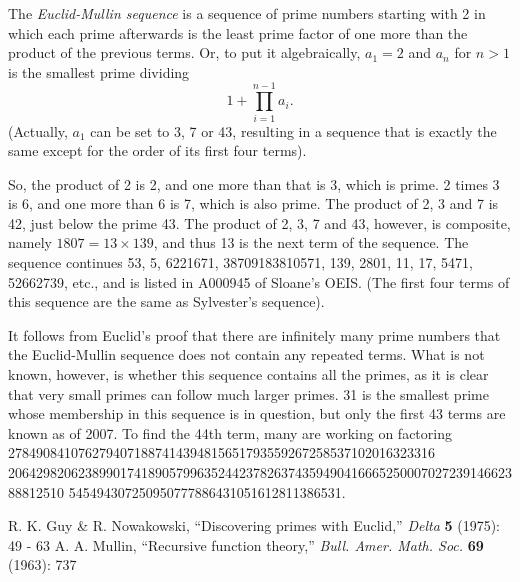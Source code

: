 \documentclass[12pt]{article}
\begin{document}
The {\em Euclid-Mullin sequence} is a sequence of prime numbers starting with 2 in which each prime afterwards is the least prime factor of one more than the product of the previous terms. Or, to put it algebraically, $a_1 = 2$ and $a_n$ for $n > 1$ is the smallest prime dividing $$1 + \prod_{i = 1}^{n - 1} a_i.$$ (Actually, $a_1$ can be set to 3, 7 or 43, resulting in a sequence that is exactly the same except for the order of its first four terms).

So, the product of 2 is 2, and one more than that is 3, which is prime. 2 times 3 is 6, and one more than 6 is 7, which is also prime. The product of 2, 3 and 7 is 42, just below the prime 43. The product of 2, 3, 7 and 43, however, is composite, namely $1807 = 13 \times 139$, and thus 13 is the next term of the sequence. The sequence continues 53, 5, 6221671, 38709183810571, 139, 2801, 11, 17, 5471, 52662739, etc., and is listed in A000945 of Sloane's OEIS. (The first four terms of this sequence are the same as Sylvester's sequence).

It follows from Euclid's proof that there are infinitely many prime numbers that the Euclid-Mullin sequence does not contain any repeated terms. What is not known, however, is whether this sequence contains all the primes, as it is clear that very small primes can follow much larger primes. 31 is the smallest prime whose membership in this sequence is in question, but only the first 43 terms are known as of 2007. To find the 44th term, many are working on factoring 
2784908410762794071887414394815651793559267258537102016323316
20642982062389901741890579963524423782637435949041666525000702723914662388812510
545494307250950777886431051612811386531.

\begin{thebibliography}{2}
 R. K. Guy \& R. Nowakowski, ``Discovering primes with Euclid,'' {\it Delta} {\bf 5} (1975): 49 - 63
 A. A. Mullin, ``Recursive function theory,'' {\it Bull. Amer. Math. Soc.} {\bf 69} (1963): 737
\end{thebibliography}

\end{document}
